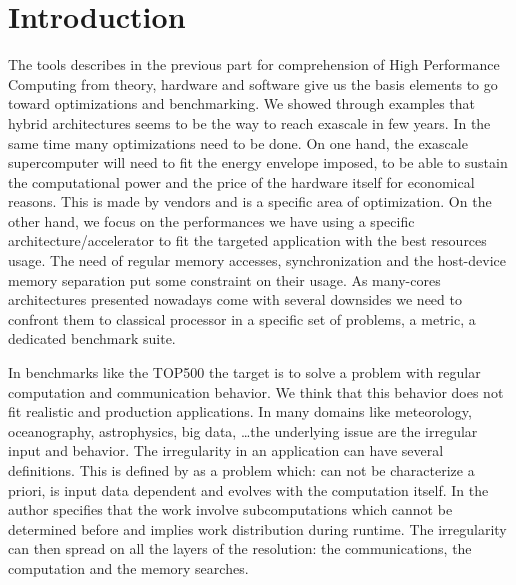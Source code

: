 
\chapter*{Introduction}

The tools describes in the previous part for comprehension of High Performance Computing from theory, hardware and software give us the basis elements to go toward optimizations and benchmarking. 
We showed through examples that hybrid architectures seems to be the way to reach exascale in few years.
In the same time many optimizations need to be done.
On one hand, the exascale supercomputer will need to fit the energy envelope imposed, to be able to sustain the computational power and the price of the hardware itself for economical reasons.  
This is made by vendors and is a specific area of optimization.
On the other hand, we focus on the performances we have using a specific architecture/accelerator to fit the targeted application with the best resources usage. 
The need of regular memory accesses, synchronization and the host-device memory separation put some constraint on their usage.
As many-cores architectures presented nowadays come with several downsides we need to confront them to classical processor in a specific set of problems, a metric, a dedicated benchmark suite. 


In benchmarks like the TOP500 the target is to solve a problem with regular computation and communication behavior. 
We think that this behavior does not fit realistic and production applications.
In many domains like meteorology, oceanography, astrophysics, big data, \dots the underlying issue are the irregular input and behavior.
The irregularity in an application can have several definitions. 
This is defined by \cite{javairregular} as a problem which: can not be characterize a priori, is input data dependent and evolves with the computation itself. 
In \cite{suss2006implementing} the author specifies that the work involve subcomputations which cannot be determined before and implies work distribution during runtime.
The irregularity can then spread on all the layers of the resolution:
the communications, the computation and the memory searches. 

